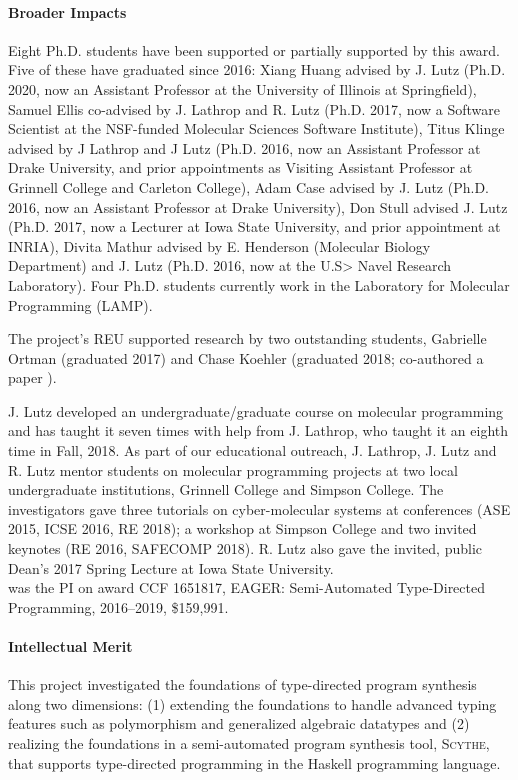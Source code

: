\paragraph{Broader Impacts}
Eight Ph.D. students have been supported or partially supported by this award. Five of these have graduated since 2016:  Xiang Huang advised by J. Lutz (Ph.D. 2020, now an Assistant Professor at the University of Illinois at Springfield), Samuel Ellis co-advised by J. Lathrop and R. Lutz (Ph.D. 2017, now a Software Scientist at the NSF-funded Molecular Sciences Software Institute), Titus Klinge advised by J Lathrop and J Lutz  (Ph.D. 2016, now an Assistant Professor at Drake University, and prior appointments as Visiting Assistant Professor at Grinnell College and Carleton College), Adam Case advised by J. Lutz (Ph.D. 2016, now an Assistant Professor at Drake University), Don Stull advised J. Lutz (Ph.D. 2017, now a Lecturer at Iowa State University, and prior appointment at INRIA), Divita Mathur advised by E. Henderson (Molecular Biology Department) and J. Lutz (Ph.D. 2016, now at the U.S> Navel Research Laboratory).  Four Ph.D. students currently work in the Laboratory for Molecular Programming (LAMP).  

The project's REU supported research by two outstanding students, Gabrielle Ortman (graduated 2017)  and Chase Koehler (graduated 2018; co-authored a paper \cite{cKMHL18}).

J. Lutz developed  an undergraduate/graduate course on molecular programming and has taught it seven times with help from J. Lathrop, who taught it an eighth time in Fall, 2018.  As part of our educational outreach, J. Lathrop, J. Lutz and R. Lutz mentor students on molecular programming projects at two local undergraduate institutions, Grinnell College and Simpson College.
The investigators gave three tutorials on cyber-molecular systems at conferences (ASE 2015, ICSE 2016, RE 2018); a workshop at Simpson College and two invited keynotes (RE 2016, SAFECOMP 2018).
R. Lutz also gave the invited, public Dean's 2017 Spring Lecture at Iowa State University. \\

 was the PI on award CCF 1651817, EAGER: Semi-Automated Type-Directed Programming, 2016--2019, \$159,991.
%
\paragraph{Intellectual Merit}
This project investigated the foundations of type-directed program synthesis along two dimensions: (1) extending the foundations to handle advanced typing features such as polymorphism and generalized algebraic datatypes and (2) realizing the foundations in a semi-automated program synthesis tool, \textsc{Scythe}, that supports type-directed programming in the Haskell programming language.

